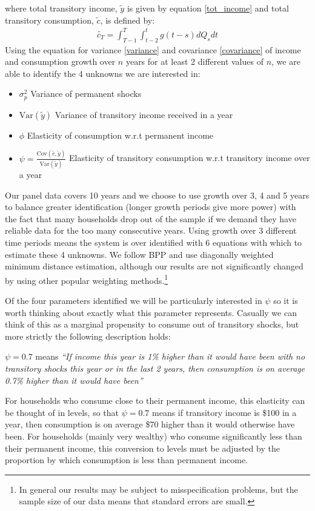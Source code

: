 \documentclass[titlepage]{\econtex}\newcommand{\texname}{IncomeUncertainty}
\begin{document}
where total transitory income, $\tilde{y}$ is given by equation \ref{tot_income} and total transitory consumption, $\tilde{c}$, is defined by:
\begin{align}
\tilde{c_T} = \int_{T-1}^{T}\int_{t-2}^{t} g(t-s)dQ_s dt \label{tot_cons}
\end{align}
Using the equation for variance \ref{variance} and covariance \ref{covariance} of income and consumption growth over $n$ years for at least 2 different values of $n$, we are able to identify the 4 unknowns we are interested in:
	\begin{itemize}
	\item $\sigma^2_p$ Variance of permanent shocks
	\item $\mathrm{Var}(\tilde{y})$ Variance of transitory income received in a year
	\item $\phi$ Elasticity of consumption w.r.t permanent income
	\item $\psi = \frac{\mathrm{Cov}(\tilde{c},\tilde{y})}{\mathrm{Var}(\tilde{y})}$ Elasticity of transitory consumption w.r.t transitory income over a year
\end{itemize}
Our panel data covers 10 years and we choose to use growth over 3, 4 and 5 years to balance greater identification (longer growth periods give more power) with the fact that many households drop out of the sample if we demand they have reliable data for the too many consecutive years. Using growth over 3 different time periods means the system is over identified with 6 equations with which to estimate these 4 unknowns. We follow BPP and use diagonally weighted minimum distance estimation, although our results are not significantly changed by using other popular weighting methods.\footnote{In general our results may be subject to misspecification problems, but the sample size of our data means that standard errors are small.}

Of the four parameters identified we will be particularly interested in $\psi$ so it is worth thinking about exactly what this parameter represents. Casually we can think of this as a marginal propensity to consume out of transitory shocks, but more strictly the following description holds:

$\psi=0.7$ means \textit{``If income this year is 1\% higher than it would have been with no transitory shocks this year or in the last 2 years, then consumption is on average 0.7\% higher than it would have been''}

For households who consume close to their permanent income, this elasticity can be thought of in levels, so that $\psi=0.7$ means if transitory income is \$100 in a year, then consumption is on average \$70 higher than it would otherwise have been. For households (mainly very wealthy) who consume significantly less than their permanent income, this conversion to levels must be adjusted by the proportion by which consumption is less than permanent income.
\end{document}
